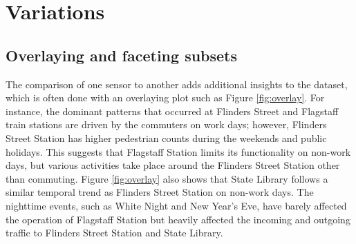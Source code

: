 \documentclass[article]{jss}
\theoremstyle{definition}
\theoremstyle{definition}
\theoremstyle{remark}
\begin{document}
\section{Variations}\label{variations}

\label{sec:examples}

\subsection{Overlaying and faceting
subsets}\label{overlaying-and-faceting-subsets}

The comparison of one sensor to another adds additional insights to the
dataset, which is often done with an overlaying plot such as Figure
\ref{fig:overlay}. For instance, the dominant patterns that occurred at
Flinders Street and Flagstaff train stations are driven by the commuters
on work days; however, Flinders Street Station has higher pedestrian
counts during the weekends and public holidays. This suggests that
Flagstaff Station limits its functionality on non-work days, but various
activities take place around the Flinders Street Station other than
commuting. Figure \ref{fig:overlay} also shows that State Library
follows a similar temporal trend as Flinders Street Station on non-work
days. The nighttime events, such as White Night and New Year's Eve, have
barely affected the operation of Flagstaff Station but heavily affected
the incoming and outgoing traffic to Flinders Street Station and State
Library.
\end{document}
